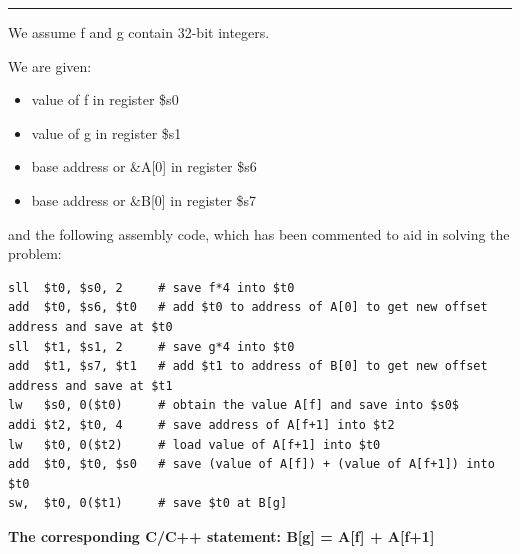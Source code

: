 \documentclass[11pt]{exam}
\newcounter{questionCounter}
\newcounter{partCounter}[questionCounter]
\newenvironment{namedquestion}[1]{%
    \addtocounter{questionCounter}{1}%
    \setcounter{partCounter}{0}%
    \vspace{.2in}%
        \noindent{\bf #1}%
    \vspace{0.3em} \hrule \vspace{.1in}%
}{}
\begin{document}
\begin{namedquestion}{Question 2.4}
We assume f and g contain 32-bit integers.

We are given:
\begin{itemize}
    \itemsep0em 
    \item value of f in register \$s0
    \item value of g in register \$s1
    \item base address or \&A[0] in register \$s6
    \item base address or \&B[0] in register \$s7
\end{itemize} 

and the following assembly code, which has been commented to aid in solving the problem:

\begin{verbatim}
sll  $t0, $s0, 2     # save f*4 into $t0
add  $t0, $s6, $t0   # add $t0 to address of A[0] to get new offset address and save at $t0
sll  $t1, $s1, 2     # save g*4 into $t0
add  $t1, $s7, $t1   # add $t1 to address of B[0] to get new offset address and save at $t1
lw   $s0, 0($t0)     # obtain the value A[f] and save into $s0$
addi $t2, $t0, 4     # save address of A[f+1] into $t2
lw   $t0, 0($t2)     # load value of A[f+1] into $t0
add  $t0, $t0, $s0   # save (value of A[f]) + (value of A[f+1]) into $t0
sw,  $t0, 0($t1)     # save $t0 at B[g]
\end{verbatim}

\textbf{The corresponding C/C++ statement: 
B[g] = A[f] + A[f+1]}

\end{namedquestion}
\newpage
\end{document}
